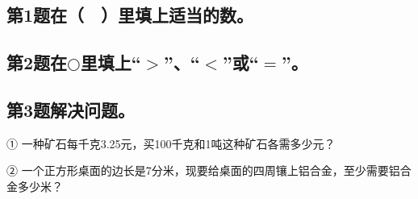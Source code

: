 \subsection*{第1题\quad 在（　）里填上适当的数。}
\subsection*{第2题\quad 在$\bigcirc$里填上“$>$”、“$<$”或“$=$”。}
\subsection*{第3题\quad 解决问题。}
\noindent ① 一种矿石每千克3.25元，买100千克和1吨这种矿石各需多少元？\par
{}
\noindent ② 一个正方形桌面的边长是7分米，现要给桌面的四周镶上铝合金，至少需要铝合金多少米？\par
{}

